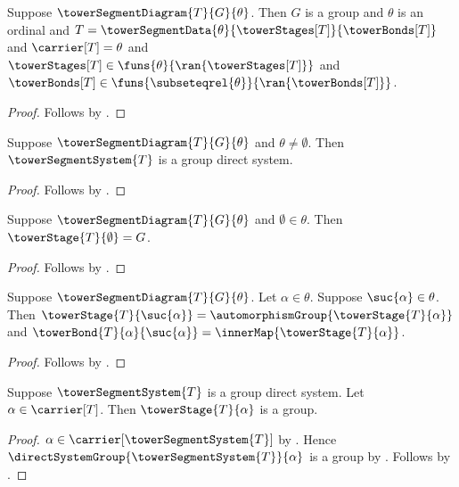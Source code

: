 \begin{proposition}\label{tower_segment_diagram_data}
    Suppose $\towerSegmentDiagram{T}{G}{\theta}$.
    Then $G$ is a group and $\theta$ is an ordinal and
        $T=\towerSegmentData{\theta}{\towerStages[T]}{\towerBonds[T]}$ and
        $\carrier[T]=\theta$ and
        $\towerStages[T]\in
            \funs{\theta}{\ran{\towerStages[T]}}$ and
        $\towerBonds[T]\in
            \funs{\subseteqrel{\theta}}{\ran{\towerBonds[T]}}$.
\end{proposition}
\begin{proof}
    Follows by .
\end{proof}

\begin{proposition}\label{tower_segment_system_is_system}
    Suppose $\towerSegmentDiagram{T}{G}{\theta}$ and
        $\theta\neq\emptyset$.
    Then $\towerSegmentSystem{T}$ is a group direct system.
\end{proposition}
\begin{proof}
    Follows by .
\end{proof}

\begin{proposition}\label{tower_segment_base}
    Suppose $\towerSegmentDiagram{T}{G}{\theta}$ and
        $\emptyset\in\theta$.
    Then $\towerStage{T}{\emptyset}=G$.
\end{proposition}
\begin{proof}
    Follows by .
\end{proof}

\begin{proposition}\label{tower_segment_successor}
    Suppose $\towerSegmentDiagram{T}{G}{\theta}$.
    Let $\alpha\in\theta$.
    Suppose $\suc{\alpha}\in\theta$.
    Then $\towerStage{T}{\suc{\alpha}}=
            \automorphismGroup{\towerStage{T}{\alpha}}$ and
        $\towerBond{T}{\alpha}{\suc{\alpha}}=
            \innerMap{\towerStage{T}{\alpha}}$.
\end{proposition}
\begin{proof}
    Follows by .
\end{proof}

\begin{proposition}\label{tower_segment_system_stage_group_bridge}
    Suppose $\towerSegmentSystem{T}$ is a group direct system.
    Let $\alpha\in\carrier[T]$.
    Then $\towerStage{T}{\alpha}$ is a group.
\end{proposition}
\begin{proof}
    $\alpha\in\carrier[\towerSegmentSystem{T}]$ by
        .
    Hence $\directSystemGroup{\towerSegmentSystem{T}}{\alpha}$
        is a group by .
    Follows by .
\end{proof}

